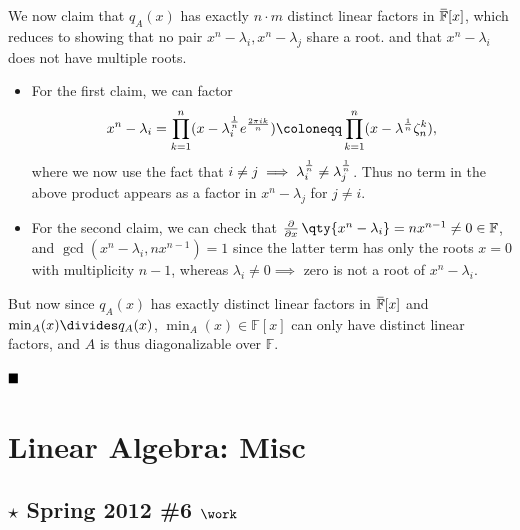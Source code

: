 \begin{solution}
We now claim that \(q_A(x)\) has exactly \(n\cdot m\) distinct linear
factors in
\(\mkern 1.5mu\overline{\mkern-1.5mu{\mathbb{F}}\mkern-1.5mu}\mkern 1.5mu[x]\),
which reduces to showing that no pair \(x^n-\lambda_i, x^n-\lambda_j\)
share a root. and that \(x^n-\lambda_i\) does not have multiple roots.

\begin{itemize}
\item
  For the first claim, we can factor
  \begin{align*}
  x^n - \lambda_i = \prod_{k=1}^n (x - \lambda_i^{1\over n} e^{2\pi i k \over n}) \coloneqq\prod_{k=1}^n (x-\lambda^{1\over n} \zeta_n^k)
  ,\end{align*}
  where we now use the fact that
  \(i\neq j \implies \lambda_i^{1\over n} \neq \lambda_j^{1\over n}\).
  Thus no term in the above product appears as a factor in
  \(x^n - \lambda_j\) for \(j\neq i\).
\item
  For the second claim, we can check that
  \({\frac{\partial }{\partial x}\,}\qty{x^n - \lambda_i} = nx^{n-1}\neq 0\in {\mathbb{F}}\),
  and \(\gcd(x^n-\lambda_i, nx^{n-1}) = 1\) since the latter term has
  only the roots \(x=0\) with multiplicity \(n-1\), whereas
  \(\lambda_i\neq 0 \implies\) zero is not a root of \(x^n-\lambda_i\).
\end{itemize}

But now since \(q_A(x)\) has exactly distinct linear factors in
\(\mkern 1.5mu\overline{\mkern-1.5mu{\mathbb{F}}\mkern-1.5mu}\mkern 1.5mu[x]\)
and \(\min_A(x) \divides q_A(x)\), \(\min_A(x) \in {\mathbb{F}}[x]\) can
only have distinct linear factors, and \(A\) is thus diagonalizable over
\({\mathbb{F}}\).

\(\hfill\blacksquare\)

\end{solution}

\hypertarget{linear-algebra-misc}{%
\section{Linear Algebra: Misc}\label{linear-algebra-misc}}

\hypertarget{star-spring-2012-6-work}{%
\subsection{\texorpdfstring{\(\star\) Spring 2012 \#6
\(\work\)}{\textbackslash star Spring 2012 \#6 \textbackslash work}}\label{star-spring-2012-6-work}}

